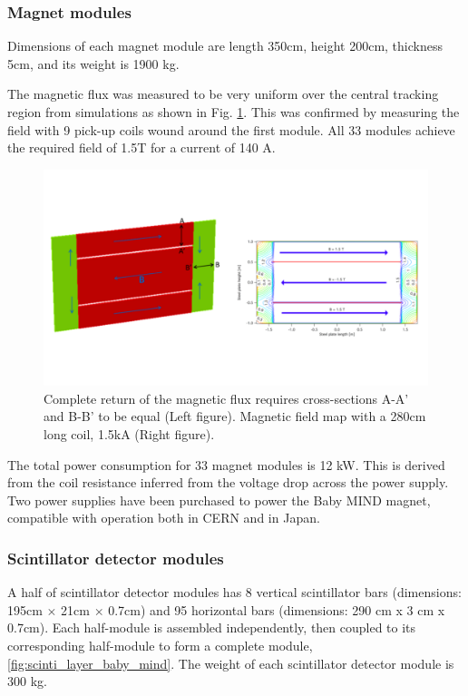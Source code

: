 \subsubsection{Magnet modules}
Dimensions of each magnet module are length 350cm, height 200cm, thickness 5cm,
and its weight is 1900 kg.


The magnetic flux was measured to be very uniform over the central tracking region
from simulations as shown in Fig. \ref{fig:mag_simulation_baby_mind}.
This was confirmed by measuring the field with 9 pick-up coils wound around the first module.
All 33 modules achieve the required field of 1.5T for a current of 140 A.

\begin{figure}%
  \begin{center}
  \includegraphics[width=1.0\textwidth]{figs/mag_simulation_baby_mind.pdf}
  \caption{Complete return of the magnetic flux requires cross-sections A-A' and B-B' to be equal (Left figure). Magnetic field map with a 280cm long coil, 1.5kA (Right figure).}
  \label{fig:mag_simulation_baby_mind}
  \end{center}
\end{figure}


The total power consumption for 33 magnet modules is 12 kW.
This is derived from the coil resistance inferred from the voltage drop across the power supply.
Two power supplies have been purchased to power the Baby MIND magnet,
compatible with operation both in CERN and in Japan.


\subsubsection{Scintillator detector modules}
A half of scintillator detector modules has 8 vertical scintillator bars
(dimensions: 195cm $\times$ 21cm $\times$ 0.7cm)
and 95 horizontal bars (dimensions: 290 cm x 3 cm x 0.7cm).
Each half-module is assembled independently, then coupled to its corresponding half-module
to form a complete module, \ref{fig:scinti_layer_baby_mind}.
The weight of each scintillator detector module is 300 kg.

